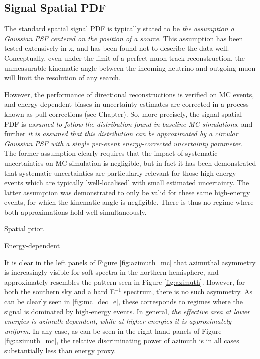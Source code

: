 \subsection{Signal Spatial PDF}

The standard spatial signal PDF is typically stated to be \emph{the assumption a Gaussian PSF centered on the position of a source}. This assumption has been tested extensively in x, and has been found not to describe the data well. Conceptually, even under the limit of a perfect muon track reconstruction, the unmeasurable kinematic angle between the incoming neutrino and outgoing muon will limit the resolution of any search.

However, the performance of directional reconstructions is verified on MC events, and energy-dependent biases in uncertainty estimates are corrected in a process known as pull corrections (see Chapter). So, more precisely, the signal spatial PDF is \emph{assumed to follow the distribution found in baseline MC simulations}, and further \emph{it is assumed that this distribution can be approximated by a circular Gaussian PSF with a single per-event energy-corrected uncertainty parameter}. The former assumption clearly requires that the impact of systematic uncertainties on MC simulation is negligible, but in fact it has been demonstrated that systematic uncertainties are particularly relevant for those high-energy events which are typically 'well-localised' with small estimated uncertainty. The latter assumption was demonstrated to only be valid for these same high-energy events, for which the kinematic angle is negligible. There is thus no regime where both approximations hold well simultaneously.

Spatial prior.

Energy-dependent

It is clear in the left panels of Figure \ref{fig:azimuth_mc} that azimuthal asymmetry is increasingly visible for soft spectra in the northern hemisphere, and approximately  resembles the pattern seen in Figure \ref{fig:azimuth}. However, for both the southern sky and a hard E$^{-1}$ spectrum, there is no such asymmetry. As can be clearly seen in \ref{fig:mc_dec_e}, these corresponds to regimes where the signal is dominated by high-energy events. In general, \emph{the effective area at lower energies is azimuth-dependent, while at higher energies it is approximately uniform}. In any case, as can be seen in the right-hand panels of Figure \ref{fig:azimuth_mc}, the relative discriminating power of azimuth is in all cases substantially less than energy proxy.

